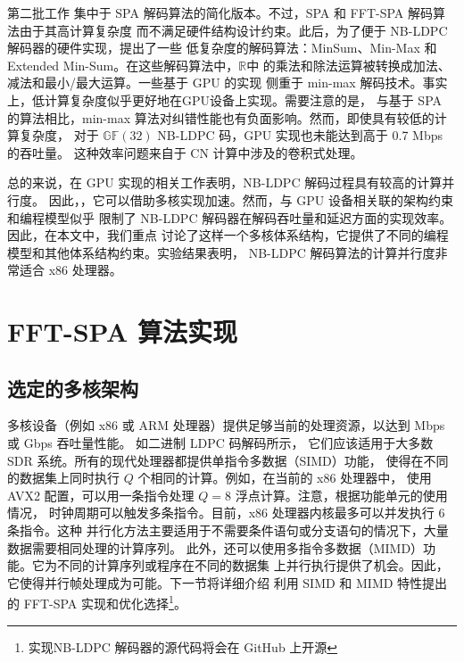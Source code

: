 \documentclass{cjc}
\begin{document}
  第二批工作\cite{noauthor_wang_nodate,noauthor_thi_nodate,noauthor_pham_nodate}
  集中于 SPA 解码算法的简化版本。不过，SPA 和 FFT-SPA 解码算法由于其高计算复杂度
  而不满足硬件结构设计约束。此后，为了便于 NB-LDPC 解码器的硬件实现，提出了一些
  低复杂度的解码算法：MinSum\cite{declercq_decoding_2007}、Min-Max\cite{declercq_decoding_2007}
  和 Extended Min-Sum\cite{noauthor_voicila_nodate}。在这些解码算法中，$\mathbb{R}$中
  的乘法和除法运算被转换成加法、减法和最小/最大运算。一些基于 GPU 的实现\cite{noauthor_wang_nodate,noauthor_thi_nodate,noauthor_pham_nodate}
  侧重于 min-max 解码技术。事实上，低计算复杂度似乎更好地在GPU设备上实现。需要注意的是，
  与基于 SPA 的算法相比，min-max 算法对纠错性能也有负面影响。然而，即使具有较低的计算复杂度，
  对于 $\mathbb{GF}(32)$ NB-LDPC 码，GPU 实现也未能达到高于 0.7 Mbps 的吞吐量。
  这种效率问题来自于 CN 计算中涉及的卷积式处理。

  总的来说，在 GPU 实现的相关工作表明，NB-LDPC 解码过程具有较高的计算并行度。
  因此，，它可以借助多核实现加速。然而，与 GPU 设备相关联的架构约束和编程模型似乎
  限制了 NB-LDPC 解码器在解码吞吐量和延迟方面的实现效率。因此，在本文中，我们重点
  讨论了这样一个多核体系结构，它提供了不同的编程模型和其他体系结构约束。实验结果表明，
  NB-LDPC 解码算法的计算并行度非常适合 x86 处理器。

\section{FFT-SPA 算法实现}\label{sec:fftspa}
\subsection{选定的多核架构}

  多核设备（例如 x86 或 ARM 处理器）提供足够当前的处理资源，以达到 Mbps 或 Gbps 吞吐量性能。
  如二进制 LDPC 码\cite{gal_high-throughput_2016,gal_high-throughput_2015}解码所示，
  它们应该适用于大多数 SDR 系统。所有的现代处理器都提供单指令多数据（SIMD）功能，
  使得在不同的数据集上同时执行 $Q$ 个相同的计算。例如，在当前的 x86 处理器中，
  使用 AVX2 配置，可以用一条指令处理 $Q=8$ 浮点计算。注意，根据功能单元的使用情况，
  时钟周期可以触发多条指令。目前，x86 处理器内核最多可以并发执行 6 条指令。这种
  并行化方法主要适用于不需要条件语句或分支语句的情况下，大量数据需要相同处理的计算序列。
  此外，还可以使用多指令多数据（MIMD）功能。它为不同的计算序列或程序在不同的数据集
  上并行执行提供了机会。因此，它使得并行帧处理成为可能。下一节将详细介绍
  利用 SIMD 和 MIMD 特性提出的 FFT-SPA 实现和优化选择\footnote{实现NB-LDPC 解码器的源代码将会在 GitHub 上开源}。
\end{document}
